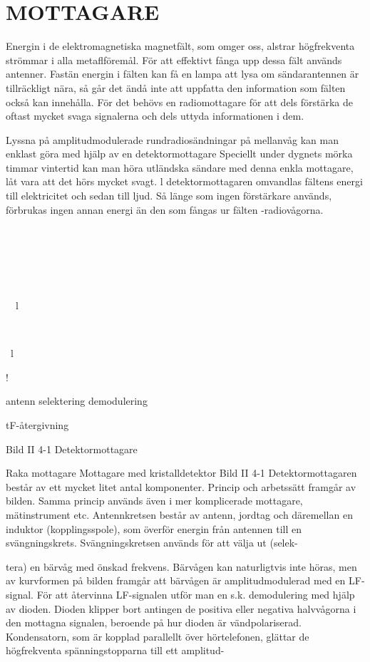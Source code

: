 \chapter{MOTTAGARE}
Energin i de elektromagnetiska magnetfält,
som omger oss, alstrar högfrekventa strömmar i alla metaflföremål. För att effektivt
fånga upp dessa fält används antenner.
Fastän energin i fälten kan få en lampa
att lysa om sändarantennen är tillräckligt
nära, så går det ändå inte att uppfatta den
information som fälten också kan innehålla.
För det behövs en radiomottagare för att
dels förstärka de oftast mycket svaga signalerna och dels uttyda informationen i dem.

Lyssna på amplitudmodulerade rundradiosändningar på mellanvåg kan man enklast
göra med hjälp av en detektormottagare
Speciellt under dygnets mörka timmar
vintertid kan man höra utländska sändare
med denna enkla mottagare, låt vara att det
hörs mycket svagt. l detektormottagaren
omvandlas fältens energi till elektricitet och
sedan till ljud. Så länge som ingen förstärkare används, förbrukas ingen annan energi
än den som fångas ur fälten -radiovågorna.

\

\

\

\ \
l

\

\
l

!

antenn selektering demodulering

tF-återgivning

Bild II 4-1 Detektormottagare

Raka mottagare
Mottagare med kristalldetektor
Bild II 4-1
Detektormottagaren består av ett mycket
litet antal komponenter. Princip och arbetssätt framgår av bilden. Samma princip används även i mer komplicerade mottagare,
mätinstrument etc. Antennkretsen består
av antenn, jordtag och däremellan en induktor (kopplingsspole), som överför energin
från antennen till en svängningskrets. Svängningskretsen används för att välja ut (selek-

tera) en bärvåg med önskad frekvens. Bärvågen kan naturligtvis inte höras, men av
kurvformen på bilden framgår att bärvågen
är amplitudmodulerad med en LF-signal.
För att återvinna LF-signalen utför man
en s.k. demodulering med hjälp av dioden.
Dioden klipper bort antingen de positiva
eller negativa halvvågorna i den mottagna
signalen, beroende på hur dioden är vändpolariserad. Kondensatorn, som är kopplad
parallellt över hörtelefonen, glättar de högfrekventa spänningstopparna till ett amplitud-

